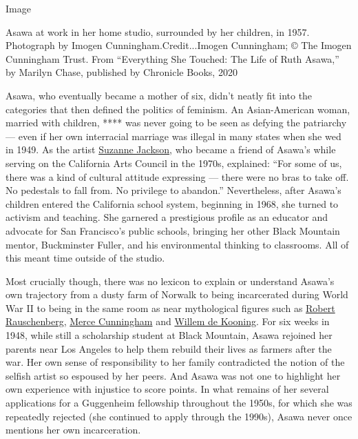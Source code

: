 Image

Asawa at work in her home studio, surrounded by her children, in 1957.
Photograph by Imogen Cunningham.Credit...Imogen Cunningham; © The Imogen
Cunningham Trust. From ``Everything She Touched: The Life of Ruth
Asawa,'' by Marilyn Chase, published by Chronicle Books, 2020

Asawa, who eventually became a mother of six, didn't neatly fit into the
categories that then defined the politics of feminism. An Asian-American
woman, married with children, **** was never going to be seen as defying
the patriarchy --- even if her own interracial marriage was illegal in
many states when she wed in 1949. As the artist
\href{https://www.nytimes.com/2019/11/19/t-magazine/suzanne-jackson-artist.html}{Suzanne
Jackson}, who became a friend of Asawa's while serving on the California
Arts Council in the 1970s, explained: ``For some of us, there was a kind
of cultural attitude expressing --- there were no bras to take off. No
pedestals to fall from. No privilege to abandon.'' Nevertheless, after
Asawa's children entered the California school system, beginning in
1968, she turned to activism and teaching. She garnered a prestigious
profile as an educator and advocate for San Francisco's public schools,
bringing her other Black Mountain mentor, Buckminster Fuller, and his
environmental thinking to classrooms. All of this meant time outside of
the studio.

Most crucially though, there was no lexicon to explain or understand
Asawa's own trajectory from a dusty farm of Norwalk to being
incarcerated during World War II to being in the same room as near
mythological figures such as
\href{https://www.nytimes.com/2015/06/03/t-magazine/robert-rauschenberg-endless-combinations.html}{Robert
Rauschenberg},
\href{https://www.nytimes.com/2017/02/07/t-magazine/art/merce-cunningham-exhibit-walker-art-center.html}{Merce
Cunningham} and
\href{https://www.nytimes.com/2016/11/15/t-magazine/art/willem-de-kooning-zao-wou-ki-two-men-show.html}{Willem
de Kooning}. For six weeks in 1948, while still a scholarship student at
Black Mountain, Asawa rejoined her parents near Los Angeles to help them
rebuild their lives as farmers after the war. Her own sense of
responsibility to her family contradicted the notion of the selfish
artist so espoused by her peers. And Asawa was not one to highlight her
own experience with injustice to score points. In what remains of her
several applications for a Guggenheim fellowship throughout the 1950s,
for which she was repeatedly rejected (she continued to apply through
the 1990s), Asawa never once mentions her own incarceration.

